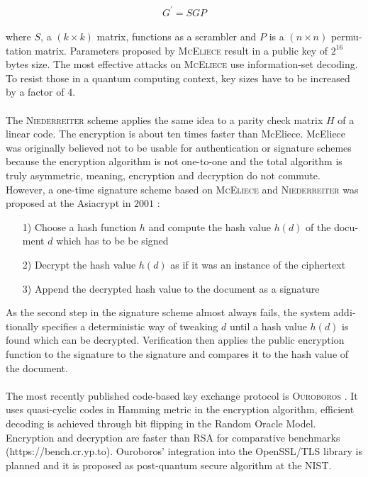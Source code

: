 \documentclass[a4paper,11pt]{article}
\begin{document}
\begin{otherlanguage}{english}
\begin{multicols}{2}
$$ G^\prime = SGP $$
\\
where $S$, a $(k \times k)$ matrix, functions as a scrambler and $P$ is a $(n \times n)$ permutation matrix. Parameters proposed by \textsc{McEliece} \cite{MCE} result in a public key of $2^{16}$ bytes size. The most effective attacks on \textsc{McEliece} use information-set decoding. To resist those in a quantum computing context, key sizes have to be increased by a factor of 4.\\
\\
The \textsc{Niederreiter} scheme \cite{NR} applies the same idea to a parity check matrix $H$ of a linear code. The encryption is about ten times faster than McEliece. McEliece was originally believed not to be usable for authentication or signature schemes because the encryption algorithm is not one-to-one and the total algorithm is truly asymmetric, meaning, encryption and decryption do not commute. However, a one-time signature scheme based on \textsc{McEliece} and \textsc{Niederreiter} was 
proposed at the Asiacrypt in $2001$ \cite{CFS}: \\

\begin{itemize} [noitemsep, nolistsep]
\item[1)] Choose a hash function $h$  and compute the hash value $h(d)$ of the document $d$ which has to be be signed
\item[2)] Decrypt the hash value $h(d)$ as if it was an instance of the ciphertext
\item[3)] Append the decrypted hash value to the document as a signature
\end{itemize} 

\vspace{0.4cm}
\noindent
As the second step in the signature scheme almost always fails, the system additionally specifies a deterministic way of tweaking $d$ until a hash value $h(d)$ is found which can be decrypted. Verification then applies the public encryption function to the signature to the signature and compares it to the hash value of the document. \\
\\
The most recently published code-based key exchange protocol is \textsc{Ouroboros} \cite{OUR}. It uses quasi-cyclic codes in Hamming metric in the encryption algorithm, efficient decoding is achieved through bit flipping in the Random Oracle Model. Encryption and decryption are faster than RSA for comparative benchmarks (https://bench.cr.yp.to). Ouroboros' integration into the OpenSSL/TLS library is planned and it is proposed as post-quantum secure algorithm at the NIST.


\end{multicols}
\end{otherlanguage}
\end{document}
